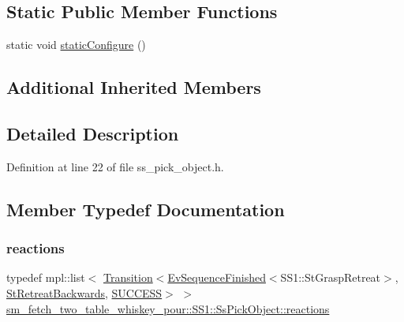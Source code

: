 \subsection*{Static Public Member Functions}
\begin{DoxyCompactItemize}
\item 
static void \hyperlink{structsm__fetch__two__table__whiskey__pour_1_1SS1_1_1SsPickObject_aeae9ffe0e58bc4a3447cc236b2b3dfc8}{static\+Configure} ()
\end{DoxyCompactItemize}
\subsection*{Additional Inherited Members}


\subsection{Detailed Description}


Definition at line 22 of file ss\+\_\+pick\+\_\+object.\+h.



\subsection{Member Typedef Documentation}
\mbox{\label{structsm__fetch__two__table__whiskey__pour_1_1SS1_1_1SsPickObject_a8f9ac1d1e06c2e8c8d4c88d2cdaf99fa}} 
\subsubsection{\texorpdfstring{reactions}{reactions}}
{\footnotesize\ttfamily typedef mpl\+::list$<$ \hyperlink{classsmacc_1_1Transition}{Transition}$<$\hyperlink{structsmacc_1_1default__events_1_1EvSequenceFinished}{Ev\+Sequence\+Finished}$<$S\+S1\+::\+St\+Grasp\+Retreat$>$, \hyperlink{structsm__fetch__two__table__whiskey__pour_1_1StRetreatBackwards}{St\+Retreat\+Backwards}, \hyperlink{structsmacc_1_1default__transition__tags_1_1SUCCESS}{S\+U\+C\+C\+E\+SS}$>$ $>$ \hyperlink{structsm__fetch__two__table__whiskey__pour_1_1SS1_1_1SsPickObject_a8f9ac1d1e06c2e8c8d4c88d2cdaf99fa}{sm\+\_\+fetch\+\_\+two\+\_\+table\+\_\+whiskey\+\_\+pour\+::\+S\+S1\+::\+Ss\+Pick\+Object\+::reactions}}



